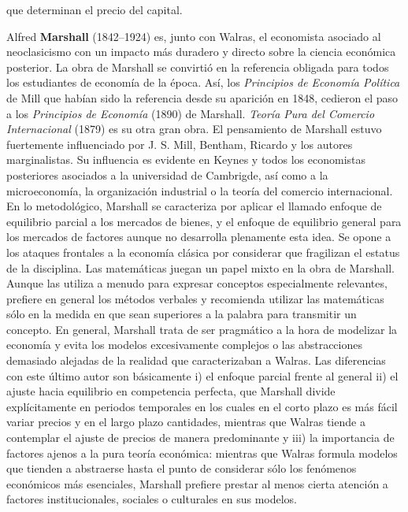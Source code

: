 \documentclass{nuevotema}
\begin{document}
que determinan el precio del capital.

Alfred \textbf{Marshall} (1842--1924) es, junto con Walras, el economista asociado al neoclasicismo con un impacto más duradero y directo sobre la ciencia económica posterior. La obra de Marshall se convirtió en la referencia obligada para todos los estudiantes de economía de la época. Así, los \textit{Principios de Economía Política} de Mill que habían sido la referencia desde su aparición en 1848, cedieron el paso a los \textit{Principios de Economía} (1890) de Marshall. \textit{Teoría Pura del Comercio Internacional} (1879) es su otra gran obra. El pensamiento de Marshall estuvo fuertemente influenciado por J. S. Mill, Bentham, Ricardo y los autores marginalistas. Su influencia es evidente en Keynes y todos los economistas posteriores asociados a la universidad de Cambrigde, así como a la microeconomía, la organización industrial o la teoría del comercio internacional. En lo metodológico, Marshall se caracteriza por aplicar el llamado enfoque de equilibrio parcial a los mercados de bienes, y el enfoque de equilibrio general para los mercados de factores aunque no desarrolla plenamente esta idea. Se opone a los ataques frontales a la economía clásica por considerar que fragilizan el estatus de la disciplina. Las matemáticas juegan un papel mixto en la obra de Marshall. Aunque las utiliza a menudo para expresar conceptos especialmente relevantes, prefiere en general los métodos verbales y recomienda utilizar las matemáticas sólo en la medida en que sean superiores a la palabra para transmitir un concepto. En general, Marshall trata de ser pragmático a la hora de modelizar la economía y evita los modelos excesivamente complejos o las abstracciones demasiado alejadas de la realidad que caracterizaban a Walras. Las diferencias con este último autor son básicamente i) el enfoque parcial frente al general ii) el ajuste hacia equilibrio en competencia perfecta, que Marshall divide explícitamente en periodos temporales en los cuales en el corto plazo es más fácil variar precios y en el largo plazo cantidades, mientras que Walras tiende a contemplar el ajuste de precios de manera predominante y iii) la importancia de factores ajenos a la pura teoría económica: mientras que Walras formula modelos que tienden a abstraerse hasta el punto de considerar sólo los fenómenos económicos más esenciales, Marshall prefiere prestar al menos cierta atención a factores institucionales, sociales o culturales en sus modelos. 
\end{document}
